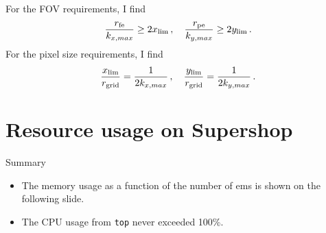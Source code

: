 \documentclass[dvipsnames]{beamer}
\begin{document}
\begin{frame}
For the FOV requirements, I find
\begin{equation*}
\frac{r_{\rm fe}}{k_{x,max}} \geq 2x_{\rm lim}\,, \quad \frac{r_{\rm pe}}{k_{y,max}} \geq 2y_{\rm lim}\,.
\end{equation*}
For the pixel size requirements, I find
\begin{equation*}
\frac{x_{\rm lim}}{r_{\rm grid}} = \frac{1}{2k_{x,max}}\,, \quad \frac{y_{\rm lim}}{r_{\rm grid}} = \frac{1}{2k_{y,max}}\,.
\end{equation*}
\end{frame}

\section{Resource usage on Supershop}

\begin{frame}{Summary}
\begin{itemize}
\item The memory usage as a function of the number of ems is shown on the following slide.
\item The CPU usage from \texttt{top} never exceeded 100\%.
\end{itemize}
\end{frame}

\begin{frame}
\begin{center}
\texttt{[image: \{supershop\_resource\_usage]}}

1.8 kB per em
\end{center}
\end{frame}
\end{document}
